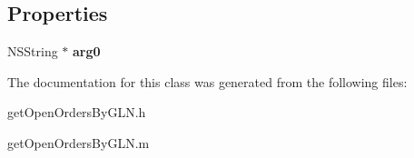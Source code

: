 \subsection*{Properties}
\begin{DoxyCompactItemize}
\item 
\hypertarget{interfaceget_open_orders_by_g_l_n_adbd225230925afb91a66c4190d107057}{}N\+S\+String $\ast$ {\bfseries arg0}\label{interfaceget_open_orders_by_g_l_n_adbd225230925afb91a66c4190d107057}

\end{DoxyCompactItemize}


The documentation for this class was generated from the following files\+:\begin{DoxyCompactItemize}
\item 
get\+Open\+Orders\+By\+G\+L\+N.\+h\item 
get\+Open\+Orders\+By\+G\+L\+N.\+m\end{DoxyCompactItemize}
